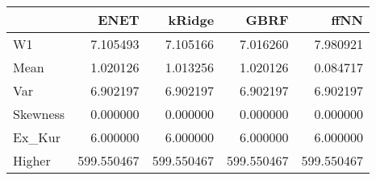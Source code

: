 \begin{tabular}{lrrrr}
\toprule
{} &        ENET &      kRidge &        GBRF &        ffNN \\
\midrule
W1       &    7.105493 &    7.105166 &    7.016260 &    7.980921 \\
Mean     &    1.020126 &    1.013256 &    1.020126 &    0.084717 \\
Var      &    6.902197 &    6.902197 &    6.902197 &    6.902197 \\
Skewness &    0.000000 &    0.000000 &    0.000000 &    0.000000 \\
Ex\_Kur   &    6.000000 &    6.000000 &    6.000000 &    6.000000 \\
Higher   &  599.550467 &  599.550467 &  599.550467 &  599.550467 \\
\bottomrule
\end{tabular}
